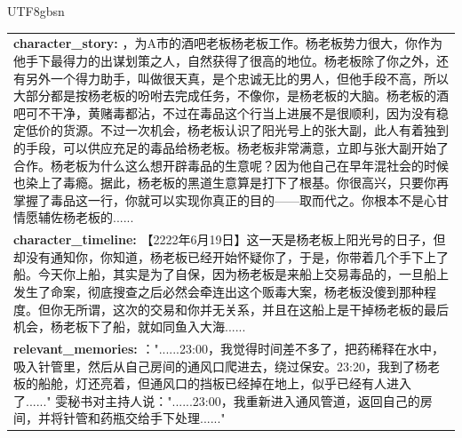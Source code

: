 \documentclass[11pt]{article}
\begin{document}
{\begin{CJK}{UTF8}{gbsn}
\begin{table}[ht!]
\begin{tabular}{|m{16cm}|}
  \textbf{  character\_story:} ，为A市的酒吧老板杨老板工作。杨老板势力很大，你作为他手下最得力的出谋划策之人，自然获得了很高的地位。杨老板除了你之外，还有另外一个得力助手，叫做很天真，是个忠诚无比的男人，但他手段不高，所以大部分都是按杨老板的吩咐去完成任务，不像你，是杨老板的大脑。杨老板的酒吧可不干净，黄赌毒都沾，不过在毒品这个行当上进展不是很顺利，因为没有稳定低价的货源。不过一次机会，杨老板认识了阳光号上的张大副，此人有着独到的手段，可以供应充足的毒品给杨老板。杨老板非常满意，立即与张大副开始了合作。杨老板为什么这么想开辟毒品的生意呢？因为他自己在早年混社会的时候也染上了毒瘾。据此，杨老板的黑道生意算是打下了根基。你很高兴，只要你再掌握了毒品这一行，你就可以实现你真正的目的——取而代之。你根本不是心甘情愿辅佐杨老板的......\\
\textbf{  character\_timeline:} \small【2222年6月19日】这一天是杨老板上阳光号的日子，但却没有通知你，你知道，杨老板已经开始怀疑你了，于是，你带着几个手下上了船。今天你上船，其实是为了自保，因为杨老板是来船上交易毒品的，一旦船上发生了命案，彻底搜查之后必然会牵连出这个贩毒大案，杨老板没傻到那种程度。但你无所谓，这次的交易和你并无关系，并且在这船上是干掉杨老板的最后机会，杨老板下了船，就如同鱼入大海......\\
\textbf{  relevant\_memories:} ："......23:00，我觉得时间差不多了，把药稀释在水中，吸入针管里，然后从自己房间的通风口爬进去，绕过保安。23:20，我到了杨老板的船舱，灯还亮着，但通风口的挡板已经掉在地上，似乎已经有人进入了......" 雯秘书对主持人说："......23:00，我重新进入通风管道，返回自己的房间，并将针管和药瓶交给手下处理......" \\


\end{tabular}
\end{table}
\end{CJK}}
\end{document}

